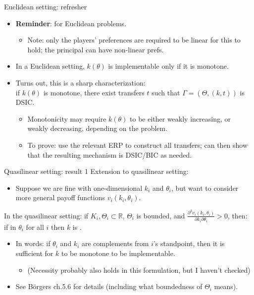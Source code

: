 \documentclass[english,10pt
,aspectratio=169
]{beamer}
\begin{document}
\begin{frame}{Euclidean setting: refresher}
	\begin{itemize}
		\item \textbf{Reminder}:  for Euclidean problems.
		\begin{itemize}
			\item Note: only the players' preferences are required to be linear for this to hold; the principal can have non-linear prefs. 
		\end{itemize}
		\item In a \alert{Euclidean} setting, $k(\theta)$ is implementable only if it is monotone.
		\item Turns out, this is a sharp characterization: \\
		if $k(\theta)$ is monotone, there exist transfers $t$ such that $\Gamma = (\Theta, (k,t))$ is DSIC.
		\begin{itemize}
			\item Monotonicity may require $k(\theta)$ to be either weakly increasing, or weakly decreasing, depending on the problem.
			\item To prove: use the relevant ERP to construct all transfers; can then show that the resulting mechanism is DSIC/BIC as needed.
		\end{itemize}
	\end{itemize}
\end{frame}




\begin{frame}{Quasilinear setting: result 1}
	Extension to \alert{quasilinear} setting:
	\begin{itemize}
		\item Suppose we are fine with one-dimensional $k_i$ and $\theta_i$, but want to consider more general payoff functions $v_i(k_i,\theta_i)$.
	\end{itemize}
	\begin{theorem}
		In the quasilinear setting: if $K_i,\Theta_i \subset \mathbb{R}$, $\Theta_i$ is bounded, and \alert{$\frac{\partial^2 v_i(k_i,\theta_i)}{\partial k_i \partial \theta_i} > 0$}, then: \\
		\centering
		if  in $\theta_i$ for all $i$ then $k$ is .
	\end{theorem}
	\begin{itemize}
		\item In words: if $\theta_i$ and $k_i$ are complements from $i$'s standpoint, then it is sufficient for $k$ to be monotone to be implementable.
		\begin{itemize}
			\item (Necessity probably also holds in this formulation, but I haven't checked)
		\end{itemize}
		\item See B{\"o}rgers ch.5.6 for details (including what boundedness of $\Theta_i$ means).
	\end{itemize}
\end{frame}
\end{document}
